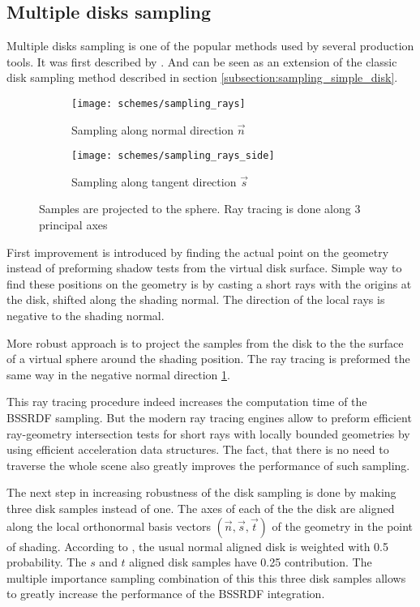 \subsection{Multiple disks sampling}
Multiple disks sampling is one of the popular methods used by several production tools. It was first
described by \cite{King:2013:BIS:2504459.2504520}. And can be seen as an extension of the classic
disk sampling method described in section \ref{subsection:sampling_simple_disk}.
\begin{figure}[h]
    \centering
    \begin{subfigure}{0.45\textwidth}
        \texttt{[image: schemes/sampling\_rays]}
        \caption{Sampling along normal direction $\vec{n}$}
        \label{fig:sampling_rays_n}
    \end{subfigure}
    \quad
    \begin{subfigure}{0.45\textwidth}
        \texttt{[image: schemes/sampling\_rays\_side]}
        \caption{Sampling along tangent direction $\vec{s}$}
    \end{subfigure}
    \caption{Samples are projected to the sphere. Ray tracing is done along 3 principal axes}
    \label{fig:sampling_rays}
\end{figure}

First improvement is introduced by finding the actual point on the geometry instead of preforming
shadow tests from the virtual disk surface. Simple way to find these positions on the geometry is by
casting a short rays with the origins at the disk, shifted along the shading normal.
The direction of the local rays is negative to the shading normal.

More robust approach is to project the samples from the disk to the the surface of a virtual sphere
around the shading position. The ray tracing is preformed the same way in the negative normal
direction \ref{fig:sampling_rays_n}.

This ray tracing procedure indeed increases the computation time of the BSSRDF sampling. But the
modern ray tracing engines allow to preform efficient ray-geometry intersection tests for short rays
with locally bounded geometries by using efficient acceleration data structures. The fact, that
there is no need to traverse the whole scene also greatly improves the performance of such sampling.

The next step in increasing robustness of the disk sampling is done by making three disk samples
instead of one. The axes of each of the the disk are aligned along the local orthonormal basis
vectors $(\vec{n},\vec{s},\vec{t})$ of the geometry in the point of shading.
According to \cite{King:2013:BIS:2504459.2504520}, the usual normal aligned disk is weighted with
0.5 probability. The $s$ and $t$ aligned disk samples have 0.25 contribution. The multiple
importance sampling combination of this this three disk samples allows to greatly increase the
performance of the BSSRDF integration.